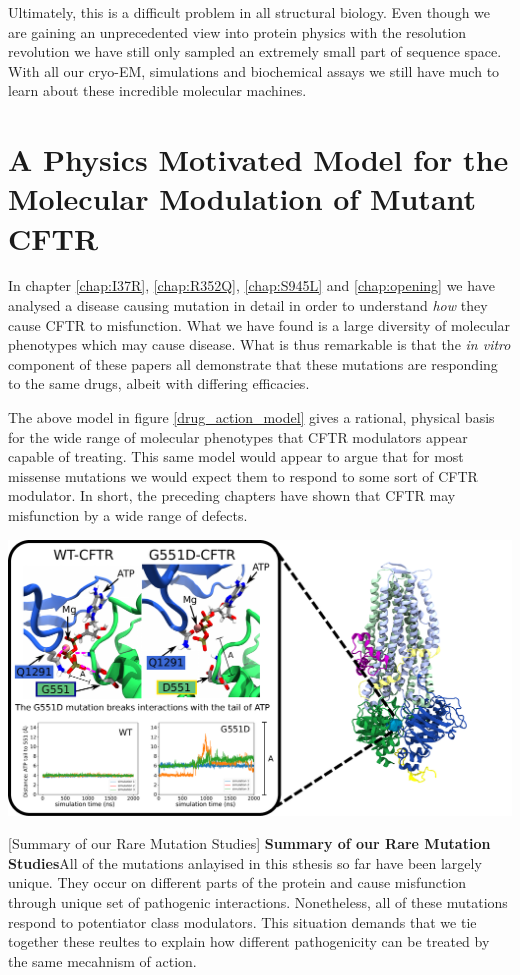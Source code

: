 Ultimately, this is a difficult problem in all structural biology. Even though we are gaining an unprecedented view into protein physics with the resolution revolution we have still only sampled an extremely small part of sequence space. With all our cryo-EM, simulations and biochemical assays we still have much to learn about these incredible molecular machines.

\section{A Physics Motivated Model for the Molecular Modulation of Mutant CFTR }
In chapter \ref{chap:I37R}, \ref{chap:R352Q}, \ref{chap:S945L} and \ref{chap:opening} we have analysed a disease causing mutation in detail in order to understand \textit{how} they cause CFTR to misfunction. What we have found is a large diversity of molecular phenotypes which may cause disease. What is thus remarkable is that the \textit{in vitro} component of these papers all demonstrate that these mutations are responding to the same drugs, albeit with differing efficacies.



The above model in figure \ref{drug_action_model} gives a rational, physical basis for the wide range of molecular phenotypes that CFTR modulators appear capable of treating. This same model would appear to argue that for most missense mutations we would expect them to respond to some sort of CFTR modulator. In short, the preceding chapters have shown that CFTR may misfunction by a wide range of defects. 

	\begin{center}
		\includegraphics[width=\textwidth]{figures/perspective/G551D.pdf}
	\end{center}
\begingroup
\captionsetup{singlelinecheck = false, justification=raggedright}
[Summary of our Rare Mutation Studies] {\textbf{Summary of our Rare Mutation Studies}}{All of the mutations anlayised in this sthesis so far have been largely unique. They occur on different parts of the protein and cause misfunction through unique set of pathogenic interactions. Nonetheless, all of these mutations respond to potentiator class modulators. This situation demands that we tie together these reultes to explain how different pathogenicity can be treated by the same mecahnism of action.} 
\endgroup


